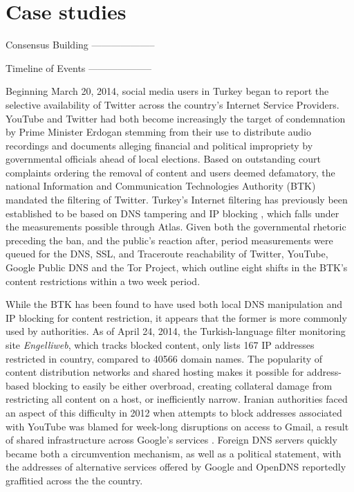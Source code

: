 \section{Case studies}


Consensus Building
--------------------



Timeline of Events
--------------------

Beginning March 20, 2014, social media users in Turkey began to report the selective availability of Twitter across the country's Internet Service Providers. YouTube and Twitter had both become increasingly the target of condemnation by Prime Minister Erdogan stemming from their use to distribute audio recordings and documents alleging financial and political impropriety by governmental officials ahead of local elections. Based on outstanding court complaints ordering the removal of content and users deemed defamatory, the national Information and Communication Technologies Authority (BTK) mandated the filtering of Twitter. Turkey's Internet filtering has previously been established to be based on DNS tampering and IP blocking \cite{akdeniz2010report}, which falls under the measurements possible through Atlas. Given both the governmental rhetoric preceding the ban, and the public's reaction after, period measurements were queued for the DNS, SSL, and Traceroute reachability of Twitter, YouTube, Google Public DNS and the Tor Project, which outline eight shifts in the BTK's content restrictions within a two week period.

While the BTK has been found to have used both local DNS manipulation and IP blocking for content restriction, it appears that the former is more commonly used by authorities. As of April 24, 2014, the Turkish-language filter monitoring site \textit{Engelliweb}, which tracks blocked content, only lists 167 IP addresses restricted in country, compared to 40566 domain names. The popularity of content distribution networks and shared hosting makes it possible for address-based blocking to easily be either overbroad, creating collateral damage from restricting all content on a host, or inefficiently narrow. Iranian authorities faced an aspect of this difficulty in 2012 when attempts to block addresses associated with YouTube was blamed for week-long disruptions on access to Gmail, a result of shared infrastructure across Google's services \cite{bbc2012gmail}. Foreign DNS servers quickly became both a circumvention mechanism, as well as a political statement, with the addresses of alternative services offered by Google and OpenDNS reportedly graffitied across the the country.

